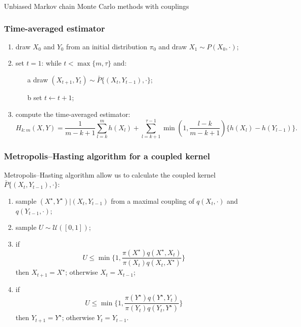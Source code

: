 \documentclass{beamer}
\begin{document}
\begin{section}{Unbiased Markov chain Monte Carlo methods with couplings}
	\begin{frame}[plain]{}
		\sectionpage
	\end{frame}
	
	\begin{frame}
		\frametitle{Time-averaged estimator}
		\begin{enumerate}
			\item draw $X_0$ and $Y_0$ from an initial distribution $\pi_0$ and draw $X_1 \sim P(X_0, \cdot)$;
			\item set $t=1$: while $t<\max\{m,\tau\}$ and:
			\begin{itemize}
				\item[a] draw $(X_{t+1}, Y_t)\sim \bar P \{(X_t, Y_{t-1}), \cdot \}$; 
				\item[b] set $t \leftarrow t+1$;
			\end{itemize}
			\item compute the time-averaged estimator:
			\footnotesize{	 	$$
				H_{k:m}(X,Y)
				= \frac{1}{m-k+1}\sum_{l=k}^{m}h(X_l) 
				+ \sum_{l=k+1}^{\tau -1}\min(1, \frac{l-k}{m-k+1})\{h(X_l)-h(Y_{l-1})\} .
				$$
			}
		\end{enumerate}
	\end{frame}
	
	\begin{frame} 	
		\frametitle{Metropolis--Hasting algorithm for a coupled kernel}
		Metropolis--Hasting algorithm allow us to calculate the coupled kernel $\bar P \{(X_t, Y_{t-1}), \cdot \}$:

			\begin{enumerate}
				\item sample $(X^\star, Y^\star) | (X_t, Y_{t-1})$ from a maximal coupling of $q(X_t, \cdot)$ and $q(Y_{t-1}, \cdot)$;
				\item sample $U \sim \mathcal{U}([0,1])$;
				\item if
				$$ U
				\leq \min\bigg \{
				1,
				\frac{ \pi(X^\star)q(X^\star,X_t)}{
					\pi(X_t)q(X_t, X^\star)}
				\bigg \}
				$$
				then $X_{t+1} = X^\star$; otherwise $X_t = X_{t-1}$;
				\item if
				$$ U
				\leq \min\bigg \{ 
				1,
				\frac{ \pi(Y^\star)q(Y^\star,Y_t)}{
					\pi(Y_t)q(Y_t, Y^\star)}
				\bigg \}
				$$
				then $Y_{t+1} = Y^\star$; otherwise $Y_t = Y_{t-1}$.
				
			\end{enumerate}
	\end{frame}



\end{section}
\end{document}
